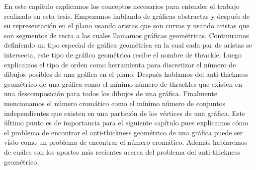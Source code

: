 En este capítulo explicamos los conceptos necesarios para entender el trabajo realizado
en esta tesis. Empezamos hablando de gráficas abstractas y después de su representación en
el plano usando aristas que son curvas y usando aristas que son segmentos de recta a las cuales
llamamos gráficas geométricas. Continuamos definiendo un tipo especial de gráfica geométrica
en la cual cada par de aristas se intersecta, este tipo de gráfica geométrica recibe el nombre de thrackle.
Luego explicamos el tipo de orden como herramienta para discretizar el número de dibujos
posibles de una gráfica en el plano.
Después hablamos del anti-thickness geométrico de una gráfica como el mínimo número de thrackles que existen
en una descomposición para todos los dibujos de una gráfica. Finalmente mencionamos el número cromático
como el mínimo número de conjuntos independientes que existen en una partición de los vértices de una
gráfica. Este último punto es de importancia para el siguiente capítulo pues explicamos cómo
el problema de encontrar el anti-thickness geométrico de una gráfica puede ser visto como
un problema de encontrar el número cromático. Además hablaremos de cuáles son los aportes
más recientes acerca del problema del anti-thickness geométrico.
